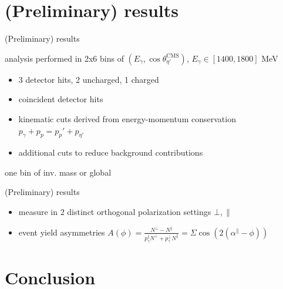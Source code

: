 \documentclass[11pt,aspectratio=169,dvipsnames]{beamer}
\newcommand{\thecolor}{black!70!blue}
\begin{document}
\section{(Preliminary) results}
\begin{frame}{(Preliminary) results}
	\begin{minipage}{0.49\linewidth}
\begin{tcolorbox}[colback=blue!5,colframe=\thecolor,title={Event selection ($\eta'$)}]
	analysis performed in 2x6 bins of $(E_\gamma,\cos\theta_{\eta'}^\text{CMS})$, $E_\gamma\in[1400,1800]$ MeV
	\begin{itemize}
		
		\item 3 detector hits, 2 uncharged, 1 charged
		\item coincident detector hits
		\item kinematic cuts derived from energy-momentum conservation $p_\gamma + p_p = p_p'+p_{\eta'}$
		\item additional cuts to reduce background contributions
	\end{itemize}
	
\end{tcolorbox}
	\end{minipage}
\begin{minipage}{.5\linewidth}
	one bin of inv. mass or global
\end{minipage}

\end{frame}


\begin{frame}{(Preliminary) results}
\begin{tcolorbox}[colback=blue!5,colframe=\thecolor,title={Method}]
	\begin{itemize}
		\item measure in 2 distinct orthogonal polarization settings $\bot,\parallel$
		\item event yield asymmetries $A(\phi)=\frac{N^\bot-N^\parallel}{p_\gamma^\parallel N^\bot + p_\gamma^\bot N^\parallel}=\Sigma\cos\left(2\left(\alpha^\parallel-\phi\right)\right)$
	\end{itemize}
\end{tcolorbox}
\end{frame}


\section{Conclusion}
\end{document}
